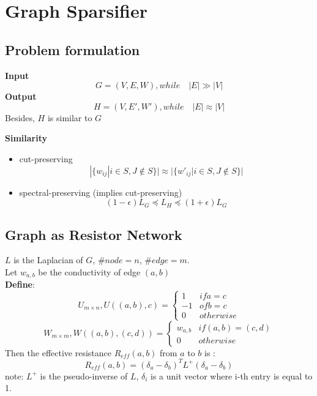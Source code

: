 \section{Graph Sparsifier}
\subsection{Problem formulation }
\textbf{Input}
\[
G=(V,E,W), while \quad |E| \gg |V|
\]
\textbf{Output}
\[
H=(V,E',W'), while \quad |E| \approx |V| 
\]
Besides, $H$ is similar to $G$

\textbf{Similarity}
\begin{itemize}
    \item cut-preserving
    \[
    |\{w_{ij}|i\in S,J \notin S \}| \approx |\{w'_{ij}|i\in S,J \notin S \}|
    \]
    \item spectral-preserving (implies cut-preserving)
    \[
    (1-\epsilon)L_G \preceq L_H \preceq (1+\epsilon)L_G
    \]
\end{itemize}

\subsection{Graph as Resistor Network}
$L$ is the Laplacian of $G$, $\#node=n$, $\#edge=m$. \\
Let $w_{a,b}$ be the conductivity of edge $(a,b)$\\
\textbf{Define}: 
\[
    U_{m\times n}, U((a,b),c)=\begin{cases}1 & if a=c \\ -1& of b=c \\ 0 & otherwise \end{cases}
\]
\[
    W_{m\times m}, W((a,b),(c,d))=\begin{cases}w_{a,b} & if (a,b)=(c,d) \\  0 & otherwise \end{cases}
\]
Then the effective resistance $R_{eff}(a,b)$ from $a$ to $b$ is :
\[
    R_{eff}(a,b)=(\delta_a-\delta_b)^TL^+(\delta_a -\delta_b)
\]
note: $L^+$ is the pseudo-inverse of $L$, $\delta_i$ is a unit vector where i-th entry is equal to 1.
